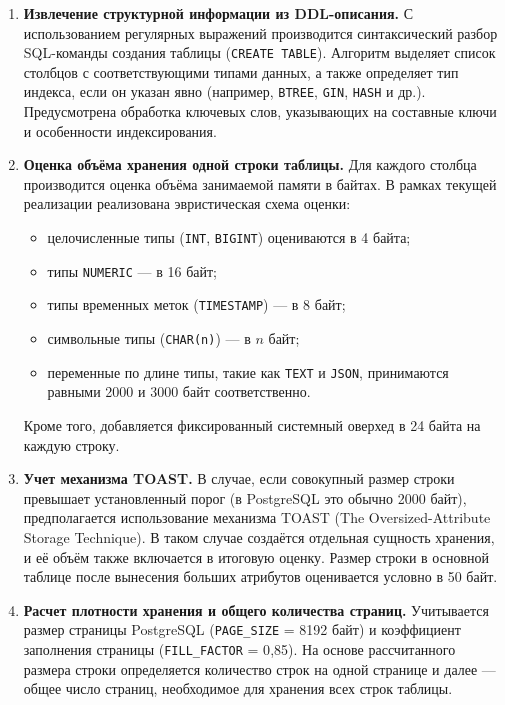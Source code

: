 \begin{enumerate}
    \item \textbf{Извлечение структурной информации из DDL-описания.} 
    С использованием регулярных выражений производится синтаксический разбор SQL-команды создания таблицы (\texttt{CREATE TABLE}). Алгоритм выделяет список столбцов с соответствующими типами данных, а также определяет тип индекса, если он указан явно (например, \texttt{BTREE}, \texttt{GIN}, \texttt{HASH} и др.). Предусмотрена обработка ключевых слов, указывающих на составные ключи и особенности индексирования.

    \item \textbf{Оценка объёма хранения одной строки таблицы.}
    Для каждого столбца производится оценка объёма занимаемой памяти в байтах. В рамках текущей реализации реализована эвристическая схема оценки:
    \begin{itemize}
        \item целочисленные типы (\texttt{INT}, \texttt{BIGINT}) оцениваются в 4 байта;
        \item типы \texttt{NUMERIC} --- в 16 байт;
        \item типы временных меток (\texttt{TIMESTAMP}) --- в 8 байт;
        \item символьные типы (\texttt{CHAR(n)}) --- в $n$ байт;
        \item переменные по длине типы, такие как \texttt{TEXT} и \texttt{JSON}, принимаются равными 2000 и 3000 байт соответственно.
    \end{itemize}
    Кроме того, добавляется фиксированный системный оверхед в 24 байта на каждую строку.

    \item \textbf{Учет механизма TOAST.}
    В случае, если совокупный размер строки превышает установленный порог (в PostgreSQL это обычно 2000 байт), предполагается использование механизма TOAST (The Oversized-Attribute Storage Technique). В таком случае создаётся отдельная сущность хранения, и её объём также включается в итоговую оценку. Размер строки в основной таблице после вынесения больших атрибутов оценивается условно в 50 байт.

    \item \textbf{Расчет плотности хранения и общего количества страниц.}
    Учитывается размер страницы PostgreSQL (\texttt{PAGE\_SIZE} = 8192 байт) и коэффициент заполнения страницы (\texttt{FILL\_FACTOR} = 0{,}85). На основе рассчитанного размера строки определяется количество строк на одной странице и далее --- общее число страниц, необходимое для хранения всех строк таблицы.


\end{enumerate}
